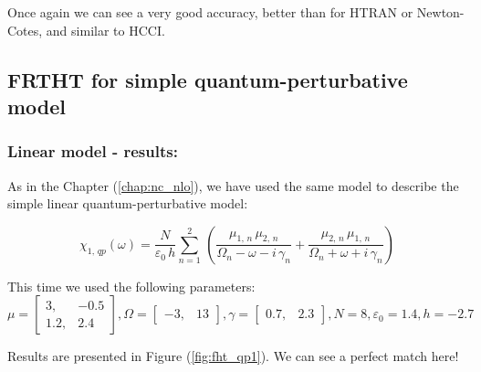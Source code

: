 \documentclass[12pt,twoside,a4paper]{article}
\numberwithin{equation}{subsection}
\numberwithin{figure}{subsection}
\begin{document}
Once again we can see a very good accuracy, better than for HTRAN or Newton-Cotes, and similar to HCCI.

\subsection{FRTHT for simple quantum-perturbative model} \label{chap:hartley_quantum}

\subsubsection*{Linear model - results:}

As in the Chapter (\ref{chap:nc_nlo}), we have used the same model to describe the simple linear quantum-perturbative model: 

\begin{equation} \label{eq:fht_qp}
  {\chi_{1, \,qp}}(\omega ) = \frac {N}{\varepsilon_0\,h} \sum_{n=1}^{2}\,(\frac {{\mu_{1, \,n}}\,{ \mu_{2, \,n}}}{{\Omega_{n}}
  - \omega  - i\,{\gamma_{n}}} + \frac {{\mu_{2, \,n}}\,{\mu_{1, \,n}}}{{\Omega_{n}} + \omega + i\,{\gamma_{n}}})
\end{equation}

This time we used the following parameters: 
\begin{equation}
	\mu = \begin{bmatrix} 
		3,   & - 0.5 \\ 
		1.2, &   2.4 
	\end{bmatrix} ,
	\Omega = \begin{bmatrix} - 3, & 13  \end{bmatrix} , 
    \gamma = \begin{bmatrix} 0.7, & 2.3 \end{bmatrix} ,   
    N = 8, 
    \varepsilon_0 = 1.4, 
    h = - 2.7
\end{equation}

Results are presented in Figure (\ref{fig:fht_qp1}). We can see a perfect match here!
\end{document}
